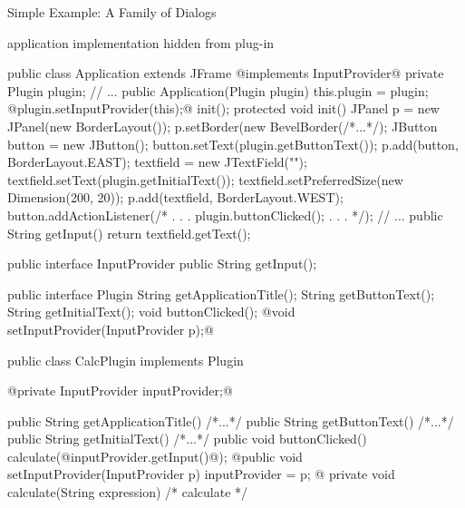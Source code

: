 \begin{frame}[fragile]{Simple Example: A Family of Dialogs}
	\begin{mycolumns}
		\begin{note}{}
			application implementation hidden from plug-in
		\end{note}
\begin{codetight}[basicstyle=\tiny]{}
public class Application extends JFrame @implements InputProvider@ {
	private Plugin plugin;
	// ...
	public Application(Plugin plugin) {
		this.plugin = plugin;
		@plugin.setInputProvider(this);@
		init();
	}
	protected void init() {
		JPanel p = new JPanel(new BorderLayout());
		p.setBorder(new BevelBorder(/*...*/);
		JButton button = new JButton();
		button.setText(plugin.getButtonText());
		p.add(button, BorderLayout.EAST);
		textfield = new JTextField("");
		textfield.setText(plugin.getInitialText());
		textfield.setPreferredSize(new Dimension(200, 20));
		p.add(textfield, BorderLayout.WEST);		
		button.addActionListener(/* . . . plugin.buttonClicked(); . . . */);		
		// ...
	}
	public String getInput() {
		return textfield.getText();
	}
}
\end{codetight}
		\mynextcolumn
{
\begin{codetight}[basicstyle=\tiny]{}
public interface InputProvider {
	public String getInput();
}
\end{codetight}
\begin{codetight}[basicstyle=\tiny]{}
public interface Plugin {
	String getApplicationTitle();
	String getButtonText();
	String getInitialText();
	void buttonClicked();
	@void setInputProvider(InputProvider p);@
}
\end{codetight}
\begin{codetight}[basicstyle=\tiny]{}
public class CalcPlugin implements Plugin {
	@private InputProvider inputProvider;@

	public String getApplicationTitle() { /*...*/ }
	public String getButtonText() { /*...*/ }
	public String getInitialText() { /*...*/ }
	public void buttonClicked() {
		calculate(@inputProvider.getInput()@);
	}
	@public void setInputProvider(InputProvider p) {
		inputProvider = p;
	}@
	private void calculate(String expression) {
		/* calculate */
	}
}
\end{codetight}
}
	\end{mycolumns}
\end{frame}

